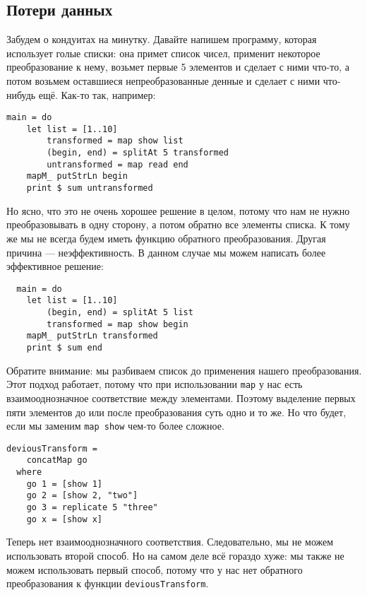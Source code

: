 \subsection{Потери данных} 
Забудем о кондуитах на минутку. Давайте напишем программу, которая использует 
голые списки: она примет список чисел, применит некоторое преобразование к нему,
возьмет первые 5 элементов и сделает с ними что-то, а потом возьмем оставшиеся
непреобразованные денные и сделает с ними что-нибудь ещё. Как-то так, например:
\begin{lstlisting}
main = do
    let list = [1..10]
        transformed = map show list
        (begin, end) = splitAt 5 transformed
        untransformed = map read end
    mapM_ putStrLn begin
    print $ sum untransformed
\end{lstlisting}
Но ясно, что это не очень хорошее решение в целом, потому что нам не нужно 
преобразовывать в одну сторону, а потом обратно все элементы списка. К тому же 
мы не всегда будем иметь функцию обратного преобразования. Другая причина 
--- неэффективность. В данном случае мы можем написать более эффективное решение:
\begin{lstlisting}
  main = do
    let list = [1..10]
        (begin, end) = splitAt 5 list
        transformed = map show begin
    mapM_ putStrLn transformed
    print $ sum end
\end{lstlisting}
Обратите внимание: мы разбиваем список до применения  нашего преобразования. 
Этот подход работает, потому что при использовании \lstinline'map' у нас есть
 взаимооднозначное соответствие между элементами. Поэтому выделение первых пяти 
 элементов до или после преобразования суть одно и то же. Но что будет, если мы 
 заменим \lstinline'map show' чем-то более сложное.
\begin{lstlisting}
deviousTransform =
    concatMap go
  where
    go 1 = [show 1]
    go 2 = [show 2, "two"]
    go 3 = replicate 5 "three"
    go x = [show x]
\end{lstlisting}
Теперь нет взаимооднозначного соответствия. Следовательно, мы не можем 
использовать второй способ. Но на самом деле всё гораздо хуже: мы также не можем 
использовать первый способ, потому что у нас нет обратного преобразования к 
функции \lstinline'deviousTransform'.
 

